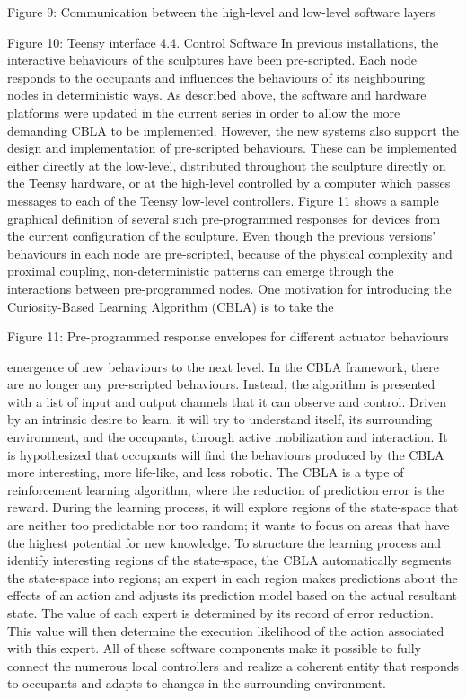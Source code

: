 Figure 9: Communication between the high-level and low-level software layers



Figure 10: Teensy interface
4.4. Control Software
In previous installations, the interactive behaviours of the sculptures have been pre-scripted. Each node responds to the occupants and influences the behaviours of its neighbouring nodes in deterministic ways.  As described above, the software and hardware platforms were updated in the current series in order to allow the more demanding CBLA to be implemented.  However, the new systems also support the design and implementation of pre-scripted behaviours.  These can be implemented either directly at the low-level, distributed throughout the sculpture directly on the Teensy hardware, or at the high-level controlled by a computer which passes messages to each of the Teensy low-level controllers.  Figure 11 shows a sample graphical definition of several such pre-programmed responses for devices from the current configuration of the sculpture.
Even though the previous versions’ behaviours in each node are pre-scripted, because of the physical complexity and proximal coupling, non-deterministic patterns can emerge through the interactions between pre-programmed nodes.  One motivation for introducing the Curiosity-Based Learning Algorithm (CBLA) is to take the 




Figure 11: Pre-programmed response envelopes for different actuator behaviours


emergence of new behaviours to the next level. In the CBLA framework, there are no longer any pre-scripted behaviours. Instead, the algorithm is presented with a list of input and output channels that it can observe and control. Driven by an intrinsic desire to learn, it will try to understand itself, its surrounding environment, and the occupants, through active mobilization and interaction. It is hypothesized that occupants will find the behaviours produced by the CBLA more interesting, more life-like, and less robotic. 
The CBLA is a type of reinforcement learning algorithm, where the reduction of prediction error is the reward. During the learning process, it will explore regions of the state-space that are neither too predictable nor too random; it wants to focus on areas that have the highest potential for new knowledge. To structure the learning process and identify interesting regions of the state-space, the CBLA automatically segments the state-space into regions; an expert in each region makes predictions about the effects of an action and adjusts its prediction model based on the actual resultant state. The value of each expert is determined by its record of error reduction. This value will then determine the execution likelihood of the action associated with this expert. 
All of these software components make it possible to fully connect the numerous local controllers and realize a coherent entity that responds to occupants and adapts to changes in the surrounding environment.

